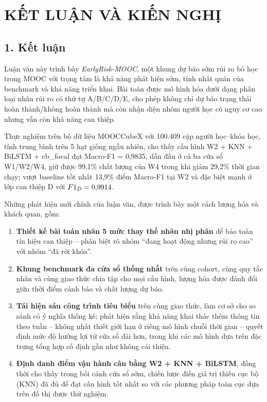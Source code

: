 \chapter{KẾT LUẬN VÀ KIẾN NGHỊ}
\label{ch:ketluan}

\section*{1. Kết luận}

Luận văn này trình bày \textit{EarlyRisk-MOOC}, một khung dự báo sớm rủi ro bỏ học trong MOOC với trọng tâm là khả năng phát hiện sớm, tính nhất quán của benchmark và khả năng triển khai. Bài toán được mô hình hóa dưới dạng phân loại nhãn rủi ro có thứ tự A/B/C/D/E, cho phép không chỉ dự báo trạng thái hoàn thành/không hoàn thành mà còn nhận diện nhóm người học có nguy cơ cao nhưng vẫn còn khả năng can thiệp.

Thực nghiệm trên bộ dữ liệu MOOCCubeX với 100.409 cặp người học--khóa học, tính trung bình trên 5 hạt giống ngẫu nhiên, cho thấy cấu hình W2 + KNN + BiLSTM + cb\_focal đạt Macro-F1 = 0,9835, dẫn đầu ở cả ba cửa sổ W1/W2/W4, giữ được 99,1\% chất lượng của W4 trong khi giảm 29,2\% thời gian chạy; vượt baseline tốt nhất 13,9\% điểm Macro-F1 tại W2 và đặc biệt mạnh ở lớp can thiệp D với $F1_{D} = 0{,}9914$.

Những phát hiện mới chính của luận văn, được trình bày một cách lượng hóa và khách quan, gồm:

\begin{enumerate}[label=(\roman*),leftmargin=1.2cm,topsep=3pt]
  \item \textbf{Thiết kế bài toán nhãn 5 mức thay thế nhãn nhị phân} để bảo toàn tín hiệu can thiệp -- phân biệt rõ nhóm ``đang hoạt động nhưng rủi ro cao'' với nhóm ``đã rời khóa''.
  \item \textbf{Khung benchmark đa cửa sổ thống nhất} trên cùng cohort, cùng quy tắc nhãn và cùng giao thức chia tập cho mọi cấu hình, lượng hóa được đánh đổi giữa thời điểm cảnh báo và chất lượng dự báo.
  \item \textbf{Tái hiện sáu công trình tiêu biểu} trên cùng giao thức, làm cơ sở cho so sánh có ý nghĩa thống kê; phát hiện rằng khả năng khai thác thêm thông tin theo tuần -- không nhất thiết giới hạn ở riêng mô hình chuỗi thời gian -- quyết định mức độ hưởng lợi từ cửa sổ dài hơn, trong khi các mô hình dựa trên đặc trưng tổng hợp cố định gần như không cải thiện.
  \item \textbf{Định danh điểm vận hành cân bằng W2 + KNN + BiLSTM}, đồng thời cho thấy trong bối cảnh cửa sổ sớm, chiến lược điền giá trị thiếu cục bộ (KNN) đã đủ để đạt cấu hình tốt nhất so với các phương pháp toàn cục dựa trên đồ thị được thử nghiệm.
\end{enumerate}

